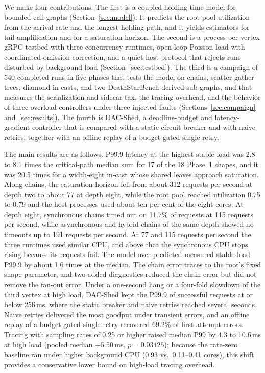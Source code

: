 We make four contributions. The first is a coupled holding-time model for bounded call graphs (Section~\ref{sec:model}). It predicts the root pool utilization from the arrival rate and the longest holding path, and it yields estimators for tail amplification and for a saturation horizon. The second is a process-per-vertex gRPC testbed with three concurrency runtimes, open-loop Poisson load with coordinated-omission correction, and a quiet-host protocol that rejects runs disturbed by background load (Section~\ref{sec:testbed}). The third is a campaign of 540 completed runs in five phases that tests the model on chains, scatter-gather trees, diamond in-casts, and two DeathStarBench-derived sub-graphs, and that measures the serialization and sidecar tax, the tracing overhead, and the behavior of three overload controllers under three injected faults (Sections~\ref{sec:campaign} and~\ref{sec:results}). The fourth is DAC-Shed, a deadline-budget and latency-gradient controller that is compared with a static circuit breaker and with naive retries, together with an offline replay of a budget-gated single retry.

The main results are as follows. P99.9 latency at the highest stable load was 2.8 to 8.1 times the critical-path median sum for 17 of the 18 Phase~1 shapes, and it was 20.5 times for a width-eight in-cast whose shared leaves approach saturation. Along chains, the saturation horizon fell from about 312 requests per second at depth two to about 77 at depth eight, while the root pool reached utilization 0.75 to 0.79 and the host processes used about ten per cent of the eight cores. At depth eight, synchronous chains timed out on 11.7\% of requests at 115 requests per second, while asynchronous and hybrid chains of the same depth showed no timeouts up to 191 requests per second. At 77 and 115 requests per second the three runtimes used similar CPU, and above that the synchronous CPU stops rising because its requests fail. The model over-predicted measured stable-load P99.9 by about 1.6 times at the median. The chain error traces to the root's fixed shape parameter, and two added diagnostics reduced the chain error but did not remove the fan-out error. Under a one-second hang or a four-fold slowdown of the third vertex at high load, DAC-Shed kept the P99.9 of successful requests at or below 256\,ms, where the static breaker and naive retries reached several seconds. Naive retries delivered the most goodput under transient errors, and an offline replay of a budget-gated single retry recovered 69.2\% of first-attempt errors. Tracing with sampling rates of 0.25 or higher raised median P99 by 4.3 to 10.6\,ms at high load (pooled median +5.50\,ms, $p = 0.03125$); because the rate-zero baseline ran under higher background CPU (0.93 vs.\ 0.11--0.41 cores), this shift provides a conservative lower bound on high-load tracing overhead.

